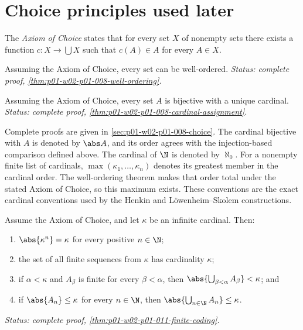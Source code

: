 \section{Choice principles used later}
\label{sec:set-prerequisites-06}

\begin{definition}
The \emph{Axiom of Choice} states that for every set \(X\) of nonempty sets
there exists a function \(c:X\to\bigcup X\) such that \(c(A)\in A\) for every
\(A\in X\).
\end{definition}

\begin{theorem}
Assuming the Axiom of Choice, every set can be well-ordered.
\textit{Status: complete proof, \cref{thm:p01-w02-p01-008-well-ordering}.}
\end{theorem}

\begin{corollary}
\label{cor:cardinal-assignment}
Assuming the Axiom of Choice, every set \(A\) is bijective with a unique
cardinal.
\textit{Status: complete proof, \cref{thm:p01-w02-p01-008-cardinal-assignment}.}
\end{corollary}

Complete proofs are given in \cref{sec:p01-w02-p01-008-choice}.  The
cardinal bijective with \(A\) is denoted by \(\abs A\), and its order agrees with the
injection-based comparison defined above.  The cardinal of \(\N\) is
denoted by \(\aleph_0\).  For a nonempty finite list of
cardinals, \(\max(\kappa_1,\ldots,\kappa_n)\) denotes its greatest member in
the cardinal order.  The well-ordering theorem makes that order total under
the stated Axiom of Choice, so this maximum exists.  These conventions are
the exact cardinal conventions used by the Henkin and
L\"owenheim--Skolem constructions.

\begin{theorem}
\label{thm:infinite-cardinal-finite-coding}
Assume the Axiom of Choice, and let \(\kappa\) be an infinite cardinal.
Then:
\begin{enumerate}
  \item \(\abs{\kappa^n}=\kappa\) for every positive \(n\in\N\);
  \item the set of all finite sequences from \(\kappa\) has cardinality
        \(\kappa\);
  \item if \(\alpha<\kappa\) and \(A_\beta\) is finite for every
        \(\beta<\alpha\), then
        \(\abs{\bigcup_{\beta<\alpha}A_\beta}<\kappa\); and
  \item if \(\abs{A_n}\leq\kappa\) for every \(n\in\N\), then
        \(\abs{\bigcup_{n\in\N}A_n}\leq\kappa\).
\end{enumerate}
\textit{Status: complete proof, \cref{thm:p01-w02-p01-011-finite-coding}.}
\end{theorem}

